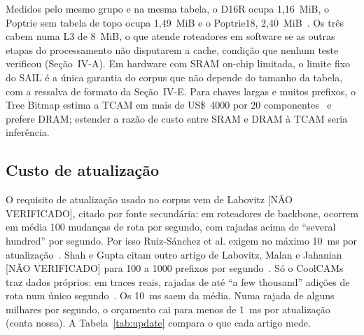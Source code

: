 \documentclass[conference,a4paper]{IEEEtran}
\begin{document}
Medidos pelo mesmo grupo e na mesma tabela, o D16R ocupa 1,16~MiB, o Poptrie sem tabela de topo ocupa 1,49~MiB e o
Poptrie18, 2,40~MiB~\cite[Tab.~3]{asai15}. Os três cabem numa L3 de 8~MiB, o que atende roteadores em software se as outras
etapas do processamento não disputarem a cache, condição que nenhum teste verificou (Seção~IV-A). Em hardware com SRAM
on-chip limitada, o limite fixo do SAIL é a única garantia do corpus que não depende do tamanho da tabela, com a ressalva
de formato da Seção~IV-E. Para chaves largas e muitos prefixos, o Tree Bitmap estima a TCAM em mais de US\$~4000 por 20
componentes~\cite[\S2.3.3]{eath04} e prefere DRAM; estender a razão de custo entre SRAM e DRAM à TCAM seria inferência.

\subsection{Custo de atualização}
O requisito de atualização usado no corpus vem de Labovitz [NÃO VERIFICADO], citado por fonte secundária: em roteadores
de backbone, ocorrem em média 100 mudanças de rota por segundo, com rajadas acima de ``several hundred'' por segundo. Por
isso Ruiz-Sánchez et al. exigem no máximo 10~ms por atualização~\cite[p.~11]{ruiz01}. Shah e Gupta citam outro artigo de
Labovitz, Malan e Jahanian [NÃO VERIFICADO] para 100 a 1000 prefixos por segundo~\cite[p.~38]{shah01}. Só o CoolCAMs traz
dados próprios: em traces reais, rajadas de até ``a few thousand'' adições de rota num único segundo~\cite[\S V]{zane03}.
Os 10~ms saem da média. Numa rajada de alguns milhares por segundo, o orçamento cai para menos de 1~ms por atualização
(conta nossa). A Tabela~\ref{tab:update} compara o que cada artigo mede.
\end{document}
